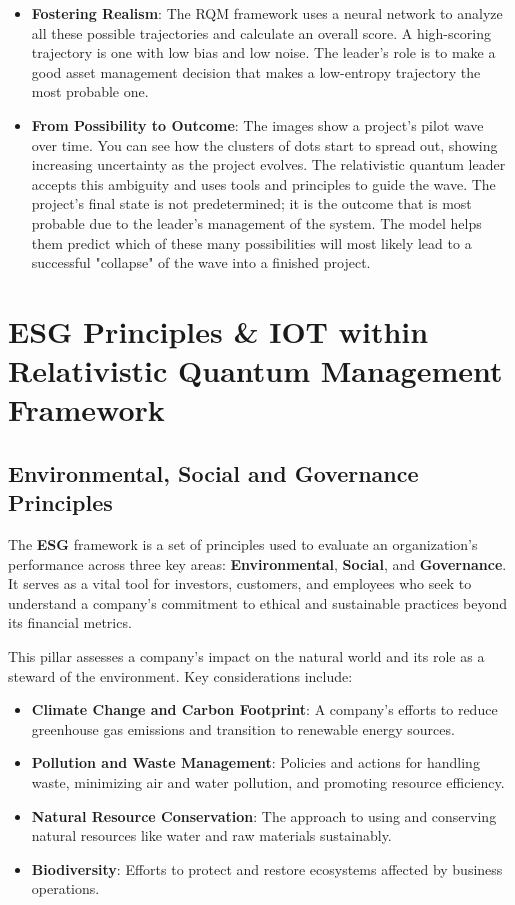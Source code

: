 \documentclass{article}
\begin{document}
\begin{itemize}
\item \textbf{Fostering Realism}: The RQM framework uses a neural network to analyze all these possible trajectories and calculate an overall score. A high-scoring trajectory is one with low bias and low noise. The leader's role is to make a good asset management decision that makes a low-entropy trajectory the most probable one. 
\item \textbf{From Possibility to Outcome}: The images show a project's pilot wave over time. You can see how the clusters of dots start to spread out, showing increasing uncertainty as the project evolves. The relativistic quantum leader accepts this ambiguity and uses tools and principles to guide the wave. The project's final state is not predetermined; it is the outcome that is most probable due to the leader's management of the system. The model helps them predict which of these many possibilities will most likely lead to a successful "collapse" of the wave into a finished project.
\end{itemize}
\newpage
\section{ESG Principles \& IOT within Relativistic Quantum Management Framework}
\label{Sec5}
\subsection*{Environmental, Social and Governance Principles}
The \textbf{ESG} framework is a set of principles used to evaluate an organization's performance across three key areas: \textbf{Environmental}, \textbf{Social}, and \textbf{Governance}. It serves as a vital tool for investors, customers, and employees who seek to understand a company's commitment to ethical and sustainable practices beyond its financial metrics.


This pillar assesses a company's impact on the natural world and its role as a steward of the environment. Key considerations include:

\begin{itemize}
    \item \textbf{Climate Change and Carbon Footprint}: A company's efforts to reduce greenhouse gas emissions and transition to renewable energy sources.
    \item \textbf{Pollution and Waste Management}: Policies and actions for handling waste, minimizing air and water pollution, and promoting resource efficiency.
    \item \textbf{Natural Resource Conservation}: The approach to using and conserving natural resources like water and raw materials sustainably.
    \item \textbf{Biodiversity}: Efforts to protect and restore ecosystems affected by business operations.
\end{itemize}
\end{document}
